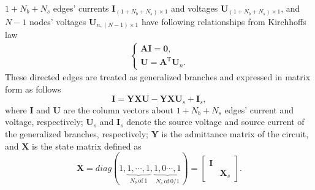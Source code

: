 \documentclass{article}
\def\T{\mathrm{T}}
\begin{document}
$1+N_b+N_s$ edges' currents $\bm{I}_{(1+N_b+N_s)\times 1}$ and voltages $\bm{U}_{(1+N_b+N_s)\times 1}$, and $N-1$ nodes' voltages $\bm{U}_{n, (N-1)\times 1}$ have following relationships from Kirchhoffs law
\begin{align}\label{eq:Kirchhoffs_law}
    \begin{cases}
        \bm{A} \bm{I} = \bm{0}, \\
        \bm{U}        = \bm{A}^\T \bm{U}_n.
    \end{cases}
\end{align}
These directed edges are treated as generalized branches and expressed in matrix form as follows
\begin{equation}\label{eq:generalized_branches}
    \bm{I} = \bm{Y}\bm{X} \bm{U} - \bm{Y}\bm{X} \bm{U}_s +\bm{I}_s,
\end{equation}
where $\bm{I}$ and $\bm{U}$ are the column vectors about $1+N_b+N_s$ edges' current and voltage, respectively;
$\bm{U}_s$ and $\bm{I}_s$ denote the source voltage and source current of the generalized branches, respectively;
$\bm{Y}$ is the admittance matrix of the circuit, and $\bm{X}$ is the state matrix defined as
\begin{equation}\label{eq:X}
    \bm{X} = diag(
    1,
    \underbrace{1, \cdots, 1}_{N_b~\text{of}~1},
    \underbrace{1, 0 \cdots, 1}_{N_s~\text{of}~0/1}
    )
    =\begin{bmatrix}
        \bm{I} &\\
        & \bm{X}_s
    \end{bmatrix}.
\end{equation}
\end{document}
